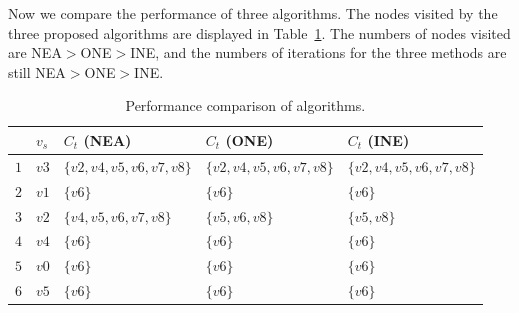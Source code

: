 Now we compare the performance of three algorithms. The nodes visited by the three proposed algorithms are displayed in Table~\ref{tab:algocomp}.
The numbers of nodes visited are NEA$>$ONE$>$INE, and the numbers of iterations for the three methods are still NEA$>$ONE$>$INE.
\begin{table}[htbp]
	\centering
	\caption{Performance comparison of algorithms.}
	\begin{tabular}{|l|l|l|l|l|}
    \hline
     & $v_s$ & $C_t$ (NEA) & $C_t$ (ONE) & $C_t$ (INE)  \\
    \hline
    $1$ & $v3$   & $\{v2,v4,v5,v6,v7,v8\}$	  & $\{v2,v4,v5,v6,v7,v8\}$	& $\{v2,v4,v5,v6,v7,v8\}$	 \\
    $2$ & $v1$   & $\{v6\}$	 &  $\{v6\}$	&  $\{v6\}$ \\
     $3$ & $v2$   & $\{v4,v5,v6,v7,v8\}$	 & $\{v5,v6,v8\}$& $\{v5,v8\}$	 \\
     $4$ & $v4$   & $\{v6\}$	 & $\{v6\}$	& $\{v6\}$	 \\
      $5$ & $v0$   & $\{v6\}$	 & $\{v6\}$	& $\{v6\}$ \\
     $6$ & $v5$   & $\{v6\}$	 & $\{v6\}$	& $\{v6\}$ \\
    \hline
    \end{tabular}
    \label{tab:algocomp}
\end{table}

